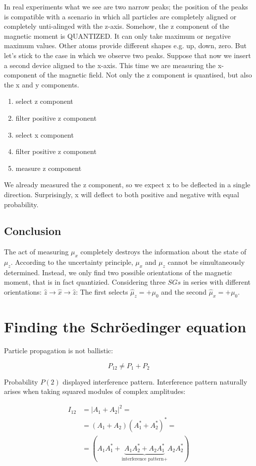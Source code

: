 In real experiments what we see are two narrow peaks; the position of the peaks is compatible with a scenario in which all particles are completely aligned or completely unti-alinged with the z-axis. Somehow, the z component of the magnetic moment is QUANTIZED. It can only take maximum or negative maximum values. Other atoms provide different shapes e.g. up, down, zero. But let’s stick to the case in which we observe two peaks.
Suppose that now we insert a second device aligned to the x-axis. This time we are measuring the x-component of the magnetic field. Not only the z component is quantised, but also the x and y components.
\begin{enumerate}
  \item select z component
  \item filter positive z component
  \item select x component
  \item filter positive z component
  \item measure z component
 \end{enumerate}
We already measured the z component, so we expect x to be deflected in a single direction. Surprisingly, x will deflect to both positive and negative with equal probability. 

  \subsection{Conclusion}
  The act of measuring $\mu_x$ completely destroys the information about the state of $\mu_z$.
  According to the uncertainty principle, $\mu_x$ and $\mu_z$ cannot be simultaneously determined.
  Instead, we only find two possible orientations of the magnetic moment, that is in fact quantizied.
  Considering three $SGs$ in series with different orientations: $\hat{z}\rightarrow\hat{x}\rightarrow\hat{z}$:
  The first selects $\hat{\mu}_z = +\mu_0$ and the second $\hat{\mu}_x = +\mu_0$.

\section{Finding the Schr\"oedinger equation}
Particle propagation is not ballistic:

$$P_{12} \neq P_1 + P_2$$

Probability $P(2)$ displayed interference pattern.
Interference pattern naturally arises when taking squared modules of complex amplitudes:

\begin{align*}
  I_{12} &= |A_1 + A_2|^2=\\
         &=(A_1 + A_2)(A_1^*+A_2^*)^*=\\
         &=(A_1A_1^*+\underbrace{A_1A_2^*+A_2A_1^*}_{\text{interference pattern+}}A_2A_2^*)
\end{align*}


